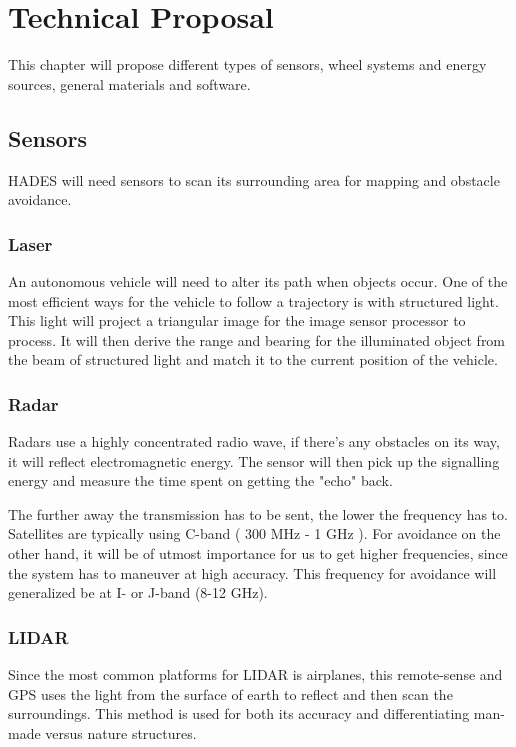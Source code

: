 \chapter{Technical Proposal}\label{ch:solutionProposal}
This chapter will propose different types of sensors, wheel systems and energy sources, general materials and software.

\section{Sensors}
HADES will need sensors to scan its surrounding area for mapping and obstacle avoidance.

\subsection{Laser}
An autonomous vehicle will need to alter its path when objects occur. One of the most efficient ways for the vehicle to follow a trajectory is with structured light.\\This light will project a triangular image for the image sensor processor to process. It will then derive the range and bearing for the illuminated object from the beam of structured light and match it to the current position of the vehicle\cite{Lasers}.


\subsection{Radar}
Radars use a highly concentrated radio wave, if there's any obstacles on its way, it will reflect electromagnetic energy. The sensor will then pick up the signalling energy and measure the time spent on getting the "echo" back\cite{Radar}.

The further away the transmission has to be sent, the lower the frequency has to.
Satellites are typically using C-band ( 300 MHz - 1 GHz ). 
For avoidance on the other hand, it will be of utmost importance for us to get higher frequencies, since the system has to maneuver at high accuracy. This frequency for avoidance will generalized be at I- or J-band (8-12 GHz)\cite{RadarTutorial}.



\subsection{LIDAR}
Since the most common platforms for LIDAR is airplanes, this remote-sense and GPS uses the light from the surface of earth to reflect and then scan the surroundings. This method is used for both its accuracy and differentiating man-made versus nature structures\cite{LIDAR}.

